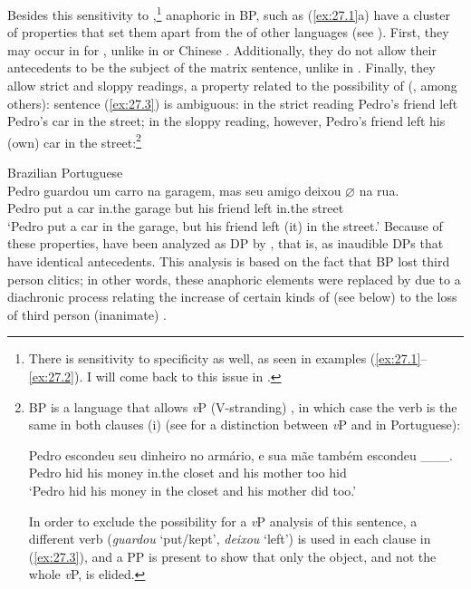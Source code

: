 \documentclass[output=paper]{langsci/langscibook}
\begin{document}
\noindent Besides this sensitivity to ,\footnote{There is sensitivity to
specificity as well, as seen in examples
(\ref{ex:27.1}--\ref{ex:27.2}). I will come back to this issue in
.} anaphoric  in BP, such as
(\ref{ex:27.1}a) have a cluster of properties that set them apart from the
 of other languages (see \citealt{CyrinoLopes2016}).  First,
they may occur in  for , unlike in  \citep{Raposo1986} or Chinese \citep{Huang1984}. Additionally, they
do not allow their antecedents to be the subject of the matrix sentence, unlike
in  \citep{Ohara2007}. Finally, they allow strict and sloppy
readings, a property related to the possibility of 
(\citealt{FiengoMay1984}, among others): sentence (\ref{ex:27.3}) is ambiguous: in
the strict reading Pedro's friend left Pedro's car in the street; in the sloppy
reading, however, Pedro's friend left his (own) car in the street:\footnote{BP
    is a language that allows \emph{v}P (V-stranding) , in which
    case the verb is the same in both clauses (i) (see
    \citealt{CyrinoMatos2005} for a distinction between \emph{v}P
     and  in Portuguese):

\begin{exe}
    \gll Pedro escondeu seu dinheiro no armário, e    sua mãe   também escondeu \_\_\_.\\
        Pedro hid his money  in.the  closet    and  his  mother too  hid\\
    \glt \enquote*{Pedro hid his money in the closet and his mother did too.}
\end{exe}

In order to exclude the possibility for a \emph{v}P  analysis of this
sentence, a different verb (\emph{guardou} `put/kept', \emph{deixou} `left') is
used in each clause in (\ref{ex:27.3}), and a PP is present to show that
only the object, and not the whole \emph{v}P, is elided.}

\ea\label{ex:27.3} Brazilian Portuguese\\
    \gll    Pedro guardou um carro na garagem, mas seu amigo deixou \textbf{$\varnothing$} na rua.\\
            Pedro put a     car       in.the   garage      but  his friend left {} in.the   street\\
    \glt    `Pedro put a car in the garage, but his friend left (it) in the street.'
\z
Because of these properties,  have been analyzed as DP
 by \citet{Cyrino1994,Cyrino1997}, that is, as inaudible DPs that
have identical antecedents.  This analysis is based on the fact that
\gls{BP} lost third person
clitics; in other words, these anaphoric elements were replaced by
 due to a diachronic process relating the increase of certain
kinds of  (see below) to the loss of third person (inanimate) .
\end{document}
